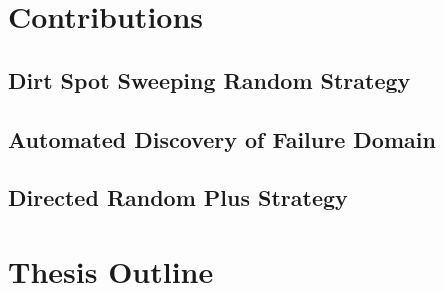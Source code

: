 \section{Contributions}
\subsection{Dirt Spot Sweeping Random Strategy}
\subsection{Automated Discovery of Failure Domain}
\subsection{Directed Random Plus Strategy}

\section{Thesis Outline}











